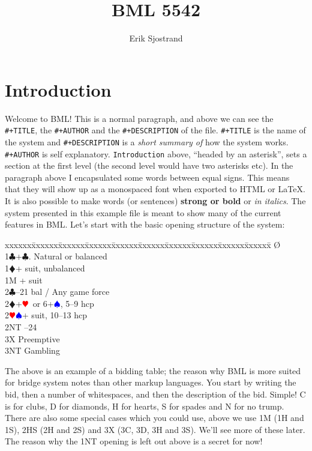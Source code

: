 \documentclass[a4paper]{article}
\title{BML 5542}
\author{Erik Sjostrand}
\newcommand{\BC}{\textcolor{OliveGreen}{$\clubsuit$}}
\newcommand{\BD}{\textcolor{RedOrange}{$\vardiamondsuit$}}
\newcommand{\BH}{\textcolor{Red}{$\varheartsuit${}}}
\newcommand{\BS}{\textcolor{Blue}{$\spadesuit${}}}
\newenvironment{bidtable}
{\begin{tabbing}

xxxxxx\=xxxxxx\=xxxxxx\=xxxxxx\=xxxxxx\=xxxxxx\=xxxxxx\=xxxxxx\=xxxxxx\=xxxxxx\=\kill}
{\end{tabbing} }%
\begin{document}
\maketitle
\tableofcontents

\section{Introduction}

Welcome to BML! This is a normal paragraph, and above we can see
the \texttt{\#+TITLE}, the \texttt{\#+AUTHOR} and the \texttt{\#+DESCRIPTION} of the file. \texttt{\#+TITLE} is
the name of the system and \texttt{\#+DESCRIPTION} is a \emph{short summary of} how
the system works. \texttt{\#+AUTHOR} is self explanatory. \texttt{Introduction} above,
``headed by an asterisk'', sets a section at the first level (the second
level would have two asterisks etc).
\bigbreak
In the paragraph above I encapsulated some words between equal
signs. This means that they will show up as a monospaced font when
exported to HTML or LaTeX. It is also possible to make words (or
sentences) \textbf{strong or bold} or \emph{in italics}.
\bigbreak
The system presented in this example file is meant to show many
of the current features in BML. Let's start with the basic opening
structure of the system:
\bigbreak
\begin{bidtable}
\O\+\\
1\BC {}+\BC . Natural or balanced\\
1\BD {}+ suit, unbalanced\\
1M + suit\\
2\BC {}--21 bal / Any game force\\
2\BD {}+\BH\ or 6+\BS , 5--9 hcp\\
2\BH\BS {}+ suit, 10--13 hcp\\
2NT --24\\
3X \> Preemptive\\
3NT \> Gambling\-
\end{bidtable}
\bigbreak
The above is an example of a bidding table; the reason why BML is
more suited for bridge system notes than other markup languages. You
start by writing the bid, then a number of whitespaces, and then the
description of the bid. Simple! C is for clubs, D for diamonds, H
for hearts, S for spades and N for no trump. There are also some
special cases which you could use, above we use 1M (1H and 1S), 2HS
(2H and 2S) and 3X (3C, 3D, 3H and 3S). We'll see more of these
later.
\bigbreak
The reason why the 1NT opening is left out above is a secret for
now!
\bigbreak
\end{document}

